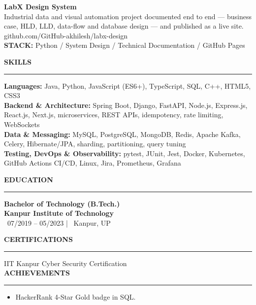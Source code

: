 \documentclass[10pt]{article}
\newcommand{\resumesection}[1]{%
  \vspace{6pt}%
  {\fontfamily{phv}\selectfont\textbf{\large\MakeUppercase{#1}}}%
  \vspace{2pt}%
  \hrule%
  \vspace{4pt}%
}
\begin{document}
\vspace{4pt}
{\textbf{LabX Design System}} \\
{\small Industrial data and visual automation project documented end to end --- business case, HLD, LLD, data-flow and database design --- and published as a live site. github.com/GitHub-akhilesh/labx-design} \\
{\footnotesize\textbf{STACK:} Python / System Design / Technical Documentation / GitHub Pages}

\resumesection{Skills}
\textbf{Languages:} Java, Python, JavaScript (ES6+), TypeScript, SQL, C++, HTML5, CSS3 \\
\textbf{Backend \& Architecture:} Spring Boot, Django, FastAPI, Node.js, Express.js, React.js, Next.js, microservices, REST APIs, idempotency, rate limiting, WebSockets \\
\textbf{Data \& Messaging:} MySQL, PostgreSQL, MongoDB, Redis, Apache Kafka, Celery, Hibernate/JPA, sharding, partitioning, query tuning \\
\textbf{Testing, DevOps \& Observability:} pytest, JUnit, Jest, Docker, Kubernetes, GitHub Actions CI/CD, Linux, Jira, Prometheus, Grafana

\resumesection{Education}
{\textbf{Bachelor of Technology (B.Tech.)}} \\
{\textbf{\textcolor{primaryblue}{Kanpur Institute of Technology}}} \\
{\footnotesize\textcolor{primaryblue}{\faCalendar*}~07/2019 -- 05/2023 \quad | \quad \textcolor{primaryblue}{\faMapMarker*}~Kanpur, UP}

\resumesection{Certifications}
IIT Kanpur Cyber Security Certification \\


\resumesection{Achievements}
\begin{itemize}
    \item HackerRank 4-Star Gold badge in SQL.
\end{itemize}
\end{document}
